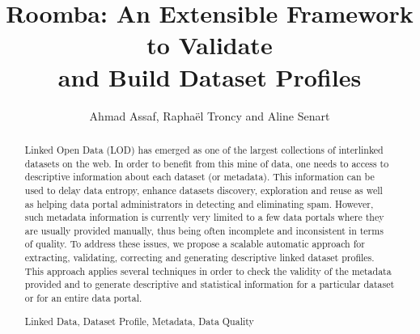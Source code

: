 \documentclass[runningheads,a4paper]{../../Util/LaTEX/llncs}
\newcommand{\keywords}[1]{\par\addvspace\baselineskip
\noindent\keywordname\enspace\ignorespaces#1}
\begin{document}
\title{Roomba: An Extensible Framework to Validate\\ and Build Dataset Profiles}

\author{Ahmad Assaf, Rapha\"{e}l Troncy and Aline Senart}


\maketitle


\begin{abstract}
Linked Open Data (LOD) has emerged as one of the largest collections of interlinked datasets on the web. In order to benefit from this mine of data, one needs to access to descriptive information about each dataset (or metadata). This information can be used to delay data entropy, enhance datasets discovery, exploration and reuse as well as helping data portal administrators in detecting and eliminating spam. However, such metadata information is currently very limited to a few data portals where they are usually provided manually, thus being often incomplete and inconsistent in terms of quality. To address these issues, we propose a scalable automatic approach for extracting, validating, correcting and generating descriptive linked dataset profiles. This approach applies several techniques in order to check the validity of the metadata provided and to generate descriptive and statistical information for a particular dataset or for an entire data portal.

\keywords{Linked Data, Dataset Profile, Metadata, Data Quality}
\end{abstract}

\end{document}

